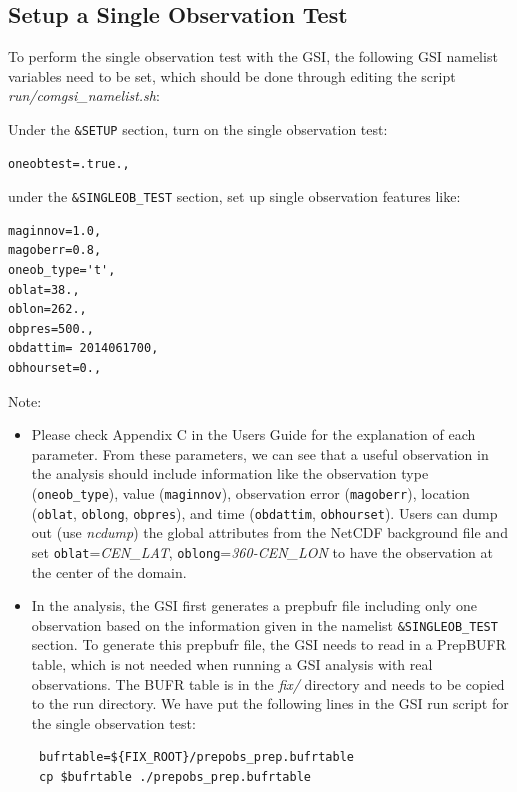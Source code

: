 \subsection{Setup a Single Observation Test}

To perform the single observation test with the GSI, the following GSI namelist variables need to be set, which should be done through editing the script \textit{run/comgsi\_namelist.sh}: 

Under the \verb|&SETUP| section, turn on the single observation test:

\begin{scriptsize}
\begin{verbatim}
oneobtest=.true.,
\end{verbatim}
\end{scriptsize}

under the \verb|&SINGLEOB_TEST| section, set up single observation features like:

\begin{scriptsize}
\begin{verbatim}
maginnov=1.0,
magoberr=0.8,
oneob_type='t',
oblat=38.,
oblon=262.,
obpres=500.,
obdattim= 2014061700,
obhourset=0.,
\end{verbatim}
\end{scriptsize}

Note:

\begin{itemize}
\item Please check Appendix C in the User\textquotesingle s Guide for the explanation of each parameter. From these parameters, we can see that a useful observation in the analysis should include information like the observation type (\verb|oneob_type|), value (\verb|maginnov|), observation error (\verb|magoberr|), location (\verb|oblat|, \verb|oblong|, \verb|obpres|), and time (\verb|obdattim|, \verb|obhourset|). Users can dump out (use \textit{ncdump}) the global attributes from the NetCDF background file and set \verb|oblat|=\textit{CEN\_LAT}, \verb|oblong|=\textit{360-CEN\_LON} to have the observation at the center of the domain.
\item In the analysis, the GSI first generates a prepbufr file including only one observation based on the information given in the namelist \verb|&SINGLEOB_TEST| section. To generate this prepbufr file, the GSI needs to read in a PrepBUFR table, which is not needed when running a GSI analysis with real observations. The BUFR table is in the \textit{fix/} directory and needs to be copied to the run directory. We have put the following lines in the GSI run script for the single observation test:
\begin{scriptsize}
\begin{verbatim}
 bufrtable=${FIX_ROOT}/prepobs_prep.bufrtable
 cp $bufrtable ./prepobs_prep.bufrtable
\end{verbatim}
\end{scriptsize}
\end{itemize}

